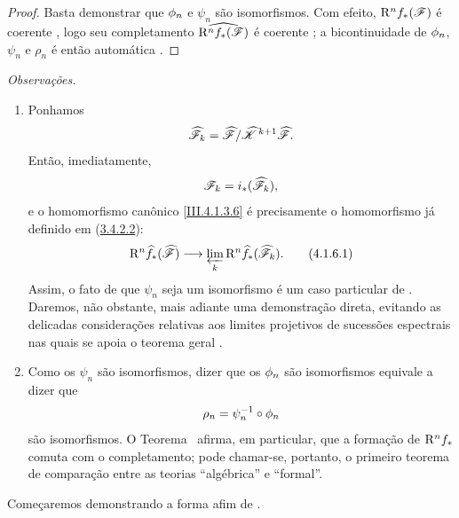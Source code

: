 \begin{proof}
Basta demonstrar que $\phi_n$ e $\psi_n$ são isomorfismos.
Com efeito, $\mathrm{R}^n f_*(\mathscr{F})$ é coerente , logo
seu completamento $\widehat{\mathrm{R}^n f_*(\mathscr{F})}$ é coerente
; a bicontinuidade de $\phi_n$, $\psi_n$ e
$\rho_n$ é então automática .
\end{proof}

\begin{env}[4.1.6]
\label{III.4.1.6}
\emph{Observações.}
\begin{enumerate}
  \item[(i)] Ponhamos
  \[
    \widehat{\mathscr{F}}_k
    =
    \widehat{\mathscr{F}}/
    \widehat{\mathscr{K}}^{\,k+1}\widehat{\mathscr{F}}.
  \]
  Então, imediatamente,
  \[
    \mathscr{F}_k=i_*(\widehat{\mathscr{F}}_k),
  \]
  e o homomorfismo canônico \eqref{III.4.1.3.6} é precisamente o
  homomorfismo já definido em (\hyperref[III.3.4.2.2]{3.4.2.2}):
  \[
    \RR^n\widehat{f}_*(\widehat{\sh{F}})
    \longrightarrow
    \varprojlim_k
    \RR^n\widehat{f}_*(\widehat{\sh{F}}_k).
    \tag{4.1.6.1}
    \label{III.4.1.6.1}
  \]
  Assim, o fato de que $\psi_n$ seja um isomorfismo é um caso particular
  de .
  Daremos, não obstante, mais adiante uma demonstração direta, evitando
  as delicadas considerações relativas aos limites projetivos de
  sucessões espectrais  nas quais se apoia o teorema
  geral .

  \item[(ii)] Como os $\psi_n$ são isomorfismos, dizer que os
  $\phi_n$ são isomorfismos equivale a dizer que
  \[
    \rho_n=\psi_n^{-1}\circ\phi_n
  \]
  são isomorfismos.
  O Teorema~ afirma, em particular, que a formação de
  $\mathrm{R}^n f_*$ comuta com o completamento; pode chamar-se, portanto, o
  primeiro teorema de comparação entre as teorias ``algébrica'' e
  ``formal''.
\end{enumerate}
Começaremos demonstrando a forma afim de .
\end{env}


